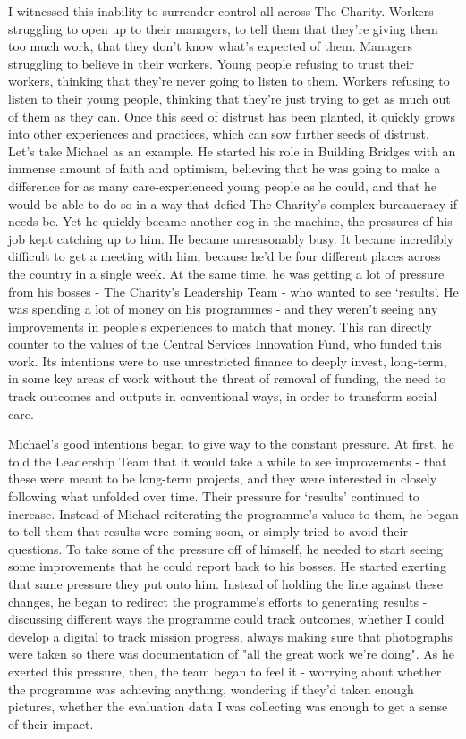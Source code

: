 I witnessed this inability to surrender control all across The Charity. Workers struggling to open up to their managers, to tell them that they’re giving them too much work, that they don’t know what's expected of them. Managers struggling to believe in their workers. Young people refusing to trust their workers, thinking that they’re never going to listen to them. Workers refusing to listen to their young people, thinking that they’re just trying to get as much out of them as they can. Once this seed of distrust has been planted, it quickly grows into other experiences and practices, which can sow further seeds of distrust. Let’s take Michael as an example. He started his role in Building Bridges with an immense amount of faith and optimism, believing that he was going to make a difference for as many care-experienced young people as he could, and that he would be able to do so in a way that defied The Charity's complex bureaucracy if needs be. Yet he quickly became another cog in the machine, the pressures of his job kept catching up to him. He became unreasonably busy. It became incredibly difficult to get a meeting with him, because he’d be four different places across the country in a single week. At the same time, he was getting a lot of pressure from his bosses - The Charity’s Leadership Team - who wanted to see `results'. He was spending a lot of money on his programmes - and they weren’t seeing any improvements in people’s experiences to match that money. This ran directly counter to the values of the Central Services Innovation Fund, who funded this work. Its intentions were to use unrestricted finance to deeply invest, long-term, in some key areas of work without the threat of removal of funding, the need to track outcomes and outputs in conventional ways, in order to transform social care.

Michael’s good intentions began to give way to the constant pressure. At first, he told the Leadership Team that it would take a while to see improvements - that these were meant to be long-term projects, and they were interested in closely following what unfolded over time. Their pressure for `results' continued to increase. Instead of Michael reiterating the programme's values to them, he began to tell them that results were coming soon, or simply tried to avoid their questions. To take some of the pressure off of himself, he needed to start seeing some improvements that he could report back to his bosses. He started exerting that same pressure they put onto him. Instead of holding the line against these changes, he began to redirect the programme’s efforts to generating results - discussing different ways the programme could track outcomes, whether I could develop a digital to track mission progress, always making sure that photographs were taken so there was documentation of "all the great work we’re doing". As he exerted this pressure, then, the team began to feel it - worrying about whether the programme was achieving anything, wondering if they’d taken enough pictures, whether the evaluation data I was collecting was enough to get a sense of their impact.

